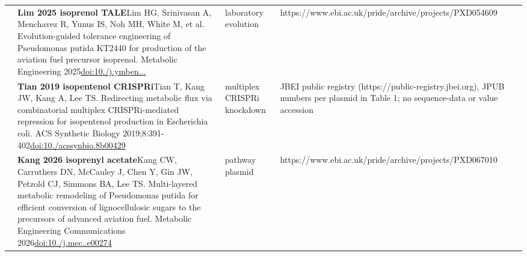 \begin{landscape}
\begin{longtable}{@{}r@{\hspace{4pt}} L{86mm} L{74mm} L{78mm}@{}}
 & \textbf{Lim 2025 isoprenol TALE}\newline Lim HG, Srinivasan A, Menchavez R, Yunus IS, Noh MH, White M, et al. Evolution-guided tolerance engineering of Pseudomonas putida KT2440 for production of the aviation fuel precursor isoprenol. Metabolic Engineering 2025\newline \href{https://doi.org/10.1016/j.ymben.2025.05.007}{doi:10./\allowbreak j.\allowbreak ymben...} & laboratory evolution & https:/\allowbreak /\allowbreak www.\allowbreak ebi.\allowbreak ac.\allowbreak uk/\allowbreak pride/\allowbreak archive/\allowbreak projects/\allowbreak PXD054609 \\
 & \textbf{Tian 2019 isopentenol CRISPRi}\newline Tian T, Kang JW, Kang A, Lee TS. Redirecting metabolic flux via combinatorial multiplex CRISPRi-mediated repression for isopentenol production in Escherichia coli. ACS Synthetic Biology 2019;8:391-402\newline \href{https://doi.org/10.1021/acssynbio.8b00429}{doi:10./\allowbreak acssynbio.\allowbreak 8b00429} & multiplex CRISPRi knockdown & JBEI public registry (https:/\allowbreak /\allowbreak public-\allowbreak registry.\allowbreak jbei.\allowbreak org), JPUB numbers per plasmid in Table 1; no sequence-\allowbreak data or value accession \\
 & \textbf{Kang 2026 isoprenyl acetate}\newline Kang CW, Carruthers DN, McCauley J, Chen Y, Gin JW, Petzold CJ, Simmons BA, Lee TS. Multi-layered metabolic remodeling of Pseudomonas putida for efficient conversion of lignocellulosic sugars to the precursors of advanced aviation fuel. Metabolic Engineering Communications 2026\newline \href{https://doi.org/10.1016/j.mec.2026.e00274}{doi:10./\allowbreak j.\allowbreak mec..\allowbreak e00274} & pathway plasmid & https:/\allowbreak /\allowbreak www.\allowbreak ebi.\allowbreak ac.\allowbreak uk/\allowbreak pride/\allowbreak archive/\allowbreak projects/\allowbreak PXD067010 \\

\end{longtable}
\end{landscape}
